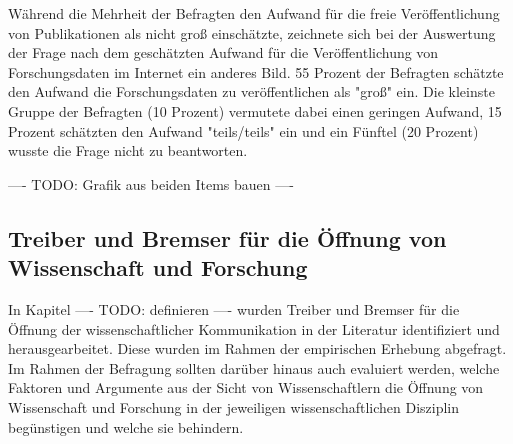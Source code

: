 Während die Mehrheit der Befragten den Aufwand für die freie Veröffentlichung von Publikationen als nicht groß einschätzte, zeichnete sich bei der Auswertung der Frage nach dem geschätzten Aufwand für die Veröffentlichung von Forschungsdaten im Internet ein anderes Bild. 55 Prozent der Befragten schätzte den Aufwand die Forschungsdaten zu veröffentlichen als "groß" ein. Die kleinste Gruppe der Befragten (10 Prozent) vermutete dabei einen geringen Aufwand, 15 Prozent schätzten den Aufwand "teils/teils" ein und ein Fünftel (20 Prozent) wusste die Frage nicht zu beantworten.

---- TODO: Grafik aus beiden Items bauen ----

\subsection{Treiber und Bremser für die Öffnung von Wissenschaft und Forschung}

In Kapitel ---- TODO: definieren ---- wurden Treiber und Bremser für die Öffnung der wissenschaftlicher Kommunikation in der Literatur identifiziert und herausgearbeitet. Diese wurden im Rahmen der empirischen Erhebung abgefragt. Im Rahmen der Befragung sollten darüber hinaus auch evaluiert werden, welche Faktoren und Argumente aus der Sicht von Wissenschaftlern die Öffnung von Wissenschaft und Forschung in der jeweiligen wissenschaftlichen Disziplin begünstigen und welche sie behindern.

